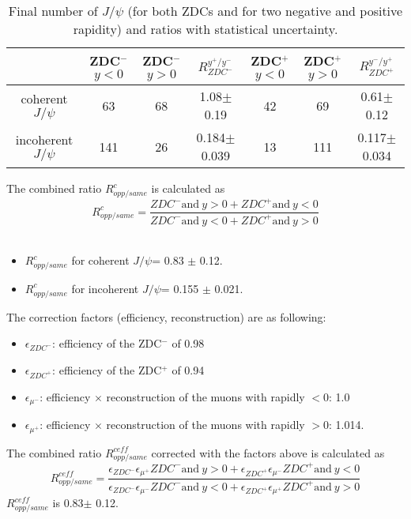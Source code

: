     \begin{table}[h]
    \begin{center}
    
    \caption{Final number of $J/\psi$ (for both ZDCs and for two negative and positive rapidity) and ratios with statistical uncertainty.}
    \label{tab:uref}
    \begin{tabular}{|c|c|c|c|c|c|c|}
    \hline
    & ZDC$^{-}$ $y<0$ & ZDC$^{-}$ $y>0$ & $R_{ZDC^{-}}^{y^{+}/y^{-}}$  & ZDC$^{+}$ $y<0$& ZDC$^{+}$ $y>0$& $R_{ZDC^{+}}^{y^{-}/y^{+}}$ \\ 
    \hline
    coherent $J/\psi$ & 63&68&1.08$\pm$0.19& 42&69 & 0.61$\pm$0.12 \\
    \hline
     incoherent $J/\psi$ &141 &26&0.184$\pm$0.039& 13&111& 0.117$\pm$0.034\\
    \hline
    \end{tabular}
    \end{center}
    
    \end{table}
    
    The combined ratio $R_{opp/same}^{c}$ is calculated as \\
      $$ R_{opp/same}^{c} = \frac{ZDC^{-} \mbox{and}~y>0 + ZDC^{+} 
      \mbox{and}~y<0}{ZDC^{-} \mbox{and}~y<0 + ZDC^{+} \mbox{and}~y>0} $$\\
    \begin{itemize}
      \item $ R_{opp/same}^{c}$ for coherent $J/\psi$= 0.83 $\pm$ 0.12.
      \item $ R_{opp/same}^{c}$ for incoherent $J/\psi$= 0.155 $\pm$ 0.021.
    \end{itemize}
    
    The correction factors (efficiency, reconstruction) are as following: 
    \begin{itemize}
      \item $\epsilon_{ZDC^{-}}$: efficiency of the ZDC$^{-}$ of 0.98
      \item $\epsilon_{ZDC^{+}}$: efficiency of the ZDC$^{+}$ of 0.94\ 
      \item $\epsilon_{\mu^{-}}$: efficiency $\times$ reconstruction of the muons 
        with rapidly $<$0: 1.0 
      \item $\epsilon_{\mu^{+}}$: efficiency $\times$ reconstruction of the muons 
        with rapidly $>$0: 1.014. 
    \end{itemize}
    
    The combined ratio  $R_{opp/same}^{ceff}$ corrected with the factors  above is 
      calculated as \\
      $$ R_{opp/same}^{ceff} = \frac{\epsilon_{ZDC^{-}} \epsilon_{\mu^{+}} ZDC^{-} 
        \mbox{and}~y>0 + \epsilon_{ZDC^{+}} \epsilon_{\mu^{-}} ZDC^{+} 
        \mbox{and}~y<0}{\epsilon_{ZDC^{-}} \epsilon_{\mu^{-}} ZDC^{-} 
        \mbox{and}~y<0 + \epsilon_{ZDC^{+}} \epsilon_{\mu^{+}} ZDC^{+} 
        \mbox{and}~y>0} $$
      $R_{opp/same}^{ceff}$ is 0.83$\pm$ 0.12.    \\
    
